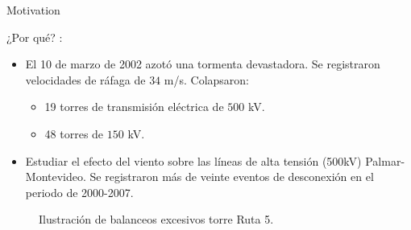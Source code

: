 \documentclass{beamer}
\begin{document}
\begin{frame}{Motivation}{}


 \begin{block}{¿Por qué? : }
 \begin{itemize}
\item El 10 de marzo de 2002 azotó una tormenta devastadora. Se registraron velocidades de ráfaga de $34$ m/s. Colapsaron:
\begin{itemize}
    \item 19 torres de transmisión eléctrica de $500$ kV.
    \item 48 torres de $150$ kV.
\end{itemize} 
\item  Estudiar el efecto del viento sobre las líneas de alta tensión (500kV) Palmar-Montevideo. Se registraron más de veinte eventos de desconexión en el periodo de 2000-2007.
\end{itemize}
 \end{block}


\begin{figure}[htbp]
	\centering
	\def\svgwidth{80mm}
	
	\caption{Ilustración de balanceos excesivos torre Ruta 5.}
	\label{fig:INTRO:IlusExcesiveBalance}
\end{figure}  

 \end{frame}
 
\end{document}
